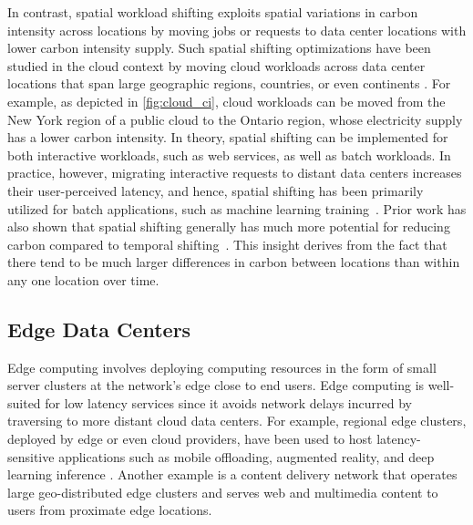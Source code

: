 In contrast, spatial workload shifting exploits spatial variations in carbon intensity across locations by moving jobs or requests to data center locations with lower carbon intensity supply. 
Such spatial shifting optimizations have been studied in the cloud context by moving cloud workloads across data center locations that span large geographic regions, countries, or even continents \cite{cloudcarbon,sukprasert2024limitations, Gao-2012-being-green, Gsteiger2024:Caribou, Murillo2024:CDNShifter}. 
For example, as depicted in \autoref{fig:cloud_ci}, cloud workloads can be moved from the New York region of a public cloud to the Ontario region, whose electricity supply has a lower carbon intensity. %
In theory, spatial shifting can be implemented for both interactive workloads, such as web services, as well as batch workloads. In practice, however, migrating interactive requests to distant data centers increases their user-perceived latency, and hence, spatial shifting has been primarily utilized for batch applications, such as machine learning training~\cite{cloudcarbon}.  Prior work has also shown that spatial shifting generally has much more potential for reducing carbon compared to temporal shifting~\cite{sukprasert2024limitations}.  This insight derives from the fact that there tend to be much larger differences in carbon between locations than within any one location over time. 




\subsection{Edge Data Centers}

Edge computing involves deploying computing resources in the form of small server clusters at the network's edge close to end users. Edge computing is well-suited for low latency services since it avoids network delays incurred by traversing to more distant cloud data centers. For example, 
regional edge clusters, deployed by edge or even cloud providers, have been used to host latency-sensitive applications such as mobile offloading, augmented reality, and deep learning inference \cite{Satya17_emergence,Satya09_Cloudlets}.  
Another example is a content delivery network that operates large geo-distributed edge clusters and serves web and multimedia content to users from proximate edge locations.

